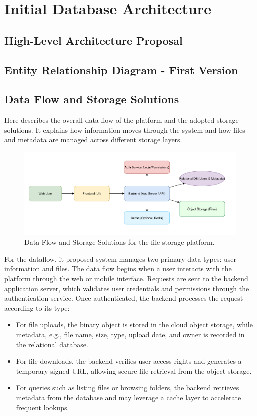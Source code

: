 \section{Initial Database Architecture}
\subsection{High-Level Architecture Proposal}
\subsection{Entity Relationship Diagram - First Version}
\subsection{Data Flow and Storage Solutions}

Here describes the overall data flow of the platform and the adopted storage solutions. It explains how information moves through the system and how files and metadata are managed across different storage layers.

\begin{figure}[H]
    \centering
    \includegraphics[width=0.95\linewidth,keepaspectratio]{initialdbarch/Dataflow.png}
    \caption{Data Flow and Storage Solutions for the file storage platform.}
    \label{fig:dataflow}
\end{figure}

For the dataflow, it proposed system manages two primary data types: user information and files. The data flow begins when a user interacts with the platform through the web or mobile interface. Requests are sent to the backend application server, which validates user credentials and permissions through the authentication service. Once authenticated, the backend processes the request according to its type:\\

\begin{itemize}
    \item For file uploads, the binary object is stored in the cloud object storage, while metadata, e.g., file name, size, type, upload date, and owner is recorded in the relational database.
    \item For file downloads, the backend verifies user access rights and generates a temporary signed URL, allowing secure file retrieval from the object storage.
    \item For queries such as listing files or browsing folders, the backend retrieves metadata from the database and may leverage a cache layer to accelerate frequent lookups.
\end{itemize}

